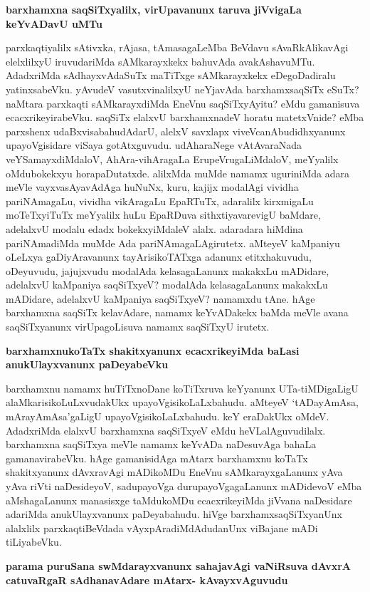 \noindent
{\bf\large{barxhamxna saqSiTxyalilx, virUpavanunx taruva jiVvigaLa keYvADavU uMTu}}\label{page192}

parxkaqtiyalilx sAtivxka, rAjasa, tAmasagaLeMba BeVdavu sAvaRkAlikavAgi elelxlilxyU iruvudariMda sAMkarayxkekx bahuvAda avakAshavuMTu. AdadxriMda sAdhayxvAdaSuTx maTiTxge sAMkarayxkekx eDegoDadiralu yatinxsabeVku. yAvudeV vasutxvinalilxyU neYjavAda barxhamxsaqSiTx eSuTx? naMtara parxkaqti sAMkarayxdiMda EneVnu saqSiTxyAyitu? eMdu gamanisuva ecacxrikeyirabeVku. saqSiTx elalxvU barxhamxnadeV horatu matetxVnide? eMba parxshenx udaBxvisabahudAdarU, alelxV savxlapx viveVcanAbudidhxyanunx upayoVgisidare viSaya gotAtxguvudu. udAharaNege vAtAvaraNada veYSamayxdiMdaloV, AhAra-vihAragaLa ErupeVrugaLiMdaloV, meYyalilx oMdubokekxyu horapaDutatxde. alilxMda muMde namamx uguriniMda adara meVle vayxvasAyavAdAga huNuNx, kuru, kajijx modalAgi vividha pariNAmagaLu, vividha vikAragaLu EpaRTuTx, adaralilx kirxmigaLu moTeTxyiTuTx meYyalilx huLu EpaRDuva sithxtiyavarevigU baMdare, adelalxvU modalu edadx bokekxyiMdaleV alalx. adaradara hiMdina pariNAmadiMda muMde Ada pariNAmagaLAgirutetx. aMteyeV kaMpaniyu oLeLxya gaDiyAravanunx tayArisikoTATxga adanunx etitxhakuvudu, oDeyuvudu, jajujxvudu modalAda kelasagaLanunx makakxLu mADidare, adelalxvU kaMpaniya saqSiTxyeV? modalAda kelasagaLanunx makakxLu mADidare, adelalxvU kaMpaniya saqSiTxyeV? namamxdu tAne. hAge barxhamxna saqSiTx kelavAdare, namamx keYvADakekx baMda meVle avana saqSiTxyanunx virUpagoLisuva namamx saqSiTxyU irutetx.

\noindent
{\bf\large{barxhamxnukoTaTx shakitxyanunx ecacxrikeyiMda baLasi anukUlayxvanunx paDeyabeVku}}\label{page193}

barxhamxnu namamx huTiTxnoDane koTiTxruva keYyanunx UTa-tiMDigaLigU alaMkarisikoLuLxvudakUkx upayoVgisikoLaLxbahudu. aMteyeV `tADayAmAsa, mArayAmAsa'gaLigU upayoVgisikoLaLxbahudu. keY eraDakUkx oMdeV. AdadxriMda elalxvU barxhamxna saqSiTxyeV eMdu heVLalAguvudilalx. barxhamxna saqSiTxya meVle namamx keYvADa naDesuvAga bahaLa gamanavirabeVku. hAge gamanisidAga mAtarx barxhamxnu koTaTx shakitxyanunx dAvxravAgi mADikoMDu EneVnu sAMkarayxgaLanunx yAva yAva riVti naDesideyoV, sadupayoVga durupayoVgagaLanunx mADidevoV eMba aMshagaLanunx manasisxge taMdukoMDu ecacxrikeyiMda jiVvana naDesidare adariMda anukUlayxvanunx paDeyabahudu. hiVge barxhamxsaqSiTxyanUnx alalxlilx parxkaqtiBeVdada vAyxpAradiMdAdudanUnx viBajane mADi tiLiyabeVku.

\noindent
{\bf\large{parama puruSana swMdarayxvanunx sahajavAgi vaNiRsuva dAvxrA catuvaRgaR sAdhanavAdare mAtarx- kAvayxvAguvudu}}\label{page193}

